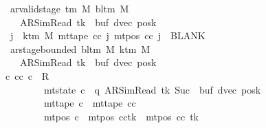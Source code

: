 \begin{isabellebody}
\ \ \ \ \ \ \ \ \ \ \ \ \ \ \ \ \ ar{\isacharunderscore}{\kern0pt}valid{\isacharunderscore}{\kern0pt}stage\ {\isacharparenleft}{\kern0pt}{\isasymGamma}{\isacharunderscore}{\kern0pt}tm\ M{\isacharparenright}{\kern0pt}\ {\isacharparenleft}{\kern0pt}bl{\isacharunderscore}{\kern0pt}tm\ M{\isacharparenright}{\kern0pt}\isanewline
\ \ \ \ \ \ \ \ \ \ \ \ \ \ \ \ \ \ \ {\isacharparenleft}{\kern0pt}AR{\isacharunderscore}{\kern0pt}SimRead{\isacharcomma}{\kern0pt}\ tk{\isacharcomma}{\kern0pt}\ {}{\isacharcomma}{\kern0pt}\ buf{\isacharcomma}{\kern0pt}\ dvec{\isacharcomma}{\kern0pt}\ posk{\isacharparenright}{\kern0pt}{\isacharsemicolon}{\kern0pt}\isanewline
\ \ \ \ \ \ \ \ \ \ \ \ \ \ \ \ \ {\isasymforall}j\ {\isasymge}\ k{\isacharunderscore}{\kern0pt}tm\ M{\isachardot}{\kern0pt}\ mt{\isacharunderscore}{\kern0pt}tape\ cc\ j\ {\isacharparenleft}{\kern0pt}mt{\isacharunderscore}{\kern0pt}pos\ cc\ j{\isacharparenright}{\kern0pt}\ {\isacharequal}{\kern0pt}\ BLANK{}{\isacharsemicolon}{\kern0pt}\isanewline
\ \ \ \ \ \ \ \ \ \ \ \ \ \ \ \ \ ar{\isacharunderscore}{\kern0pt}stage{\isacharunderscore}{\kern0pt}bounded\ {\isacharparenleft}{\kern0pt}bl{\isacharunderscore}{\kern0pt}tm\ M{\isacharparenright}{\kern0pt}\ {\isacharparenleft}{\kern0pt}k{\isacharunderscore}{\kern0pt}tm\ M{\isacharparenright}{\kern0pt}\isanewline
\ \ \ \ \ \ \ \ \ \ \ \ \ \ \ \ \ \ \ {\isacharparenleft}{\kern0pt}AR{\isacharunderscore}{\kern0pt}SimRead{\isacharcomma}{\kern0pt}\ tk{\isacharcomma}{\kern0pt}\ {}{\isacharcomma}{\kern0pt}\ buf{\isacharcomma}{\kern0pt}\ dvec{\isacharcomma}{\kern0pt}\ posk{\isacharparenright}{\kern0pt}\ {\isasymrbrakk}\isanewline
\ \ \ \ \ \ \ \ \ \ \ \ \ \ \ {\isasymLongrightarrow}\ {\isasymexists}c{}{\isachardot}{\kern0pt}\ {\isacharparenleft}{\kern0pt}cc{\isacharcomma}{\kern0pt}\ c{}{\isacharparenright}{\kern0pt}\ {\isasymin}\ R{\isacharprime}{\kern0pt}\isanewline
\ \ \ \ \ \ \ \ \ \ \ \ \ \ \ \ \ \ \ \ \ \ \ {\isasymand}\ mt{\isacharunderscore}{\kern0pt}state\ c{}\ {\isacharequal}{\kern0pt}\ {\isacharparenleft}{\kern0pt}q{\isacharcomma}{\kern0pt}\ AR{\isacharunderscore}{\kern0pt}SimRead{\isacharcomma}{\kern0pt}\ tk{\isacharcomma}{\kern0pt}\ Suc\ {}{\isacharcomma}{\kern0pt}\ buf{\isacharcomma}{\kern0pt}\ dvec{\isacharcomma}{\kern0pt}\ posk{\isacharparenright}{\kern0pt}\isanewline
\ \ \ \ \ \ \ \ \ \ \ \ \ \ \ \ \ \ \ \ \ \ \ {\isasymand}\ mt{\isacharunderscore}{\kern0pt}tape\ c{}\ {\isacharequal}{\kern0pt}\ mt{\isacharunderscore}{\kern0pt}tape\ cc\isanewline
\ \ \ \ \ \ \ \ \ \ \ \ \ \ \ \ \ \ \ \ \ \ \ {\isasymand}\ mt{\isacharunderscore}{\kern0pt}pos\ c{}\ {\isacharequal}{\kern0pt}\ {\isacharparenleft}{\kern0pt}mt{\isacharunderscore}{\kern0pt}pos\ cc{\isacharparenright}{\kern0pt}{\isacharparenleft}{\kern0pt}tk\ {\isacharcolon}{\kern0pt}{\isacharequal}{\kern0pt}\ mt{\isacharunderscore}{\kern0pt}pos\ cc\ tk\ {\isacharminus}{\kern0pt}\ {}{\isacharparenright}{\kern0pt}{\isachardoublequoteclose}\isanewline

\end{isabellebody}
